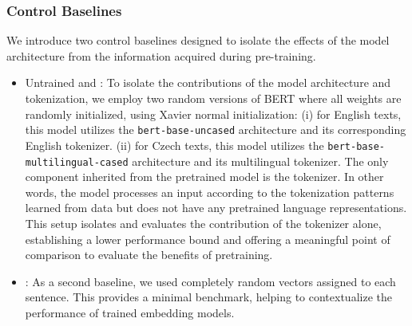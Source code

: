 \subsubsection{Control Baselines}
We introduce two control baselines designed to isolate the effects of the model architecture from the information acquired during pre-training.
\begin{itemize}
    \item Untrained \enrandombert  and \randombert:  To isolate the contributions of the model architecture and tokenization, we employ two random versions of BERT where all weights are randomly initialized, using Xavier normal initialization: (i)  \enrandombert for English texts, this model utilizes the \texttt{bert-base-uncased} architecture and its corresponding English tokenizer. (ii) \randombert for Czech texts, this model utilizes the \texttt{bert-base-multilingual-cased} architecture and its multilingual tokenizer.  The only component inherited from the pretrained model is the tokenizer. In other words, the model processes an input according to the tokenization patterns learned from data but does not have any pretrained language representations. This setup isolates and evaluates the contribution of the tokenizer alone, establishing a lower performance bound and offering a meaningful point of comparison to evaluate the benefits of pretraining.    
    \item \random: As a second baseline, we used completely random vectors assigned to each sentence. This provides a minimal benchmark, helping to contextualize the performance of trained embedding models.
\end{itemize}


